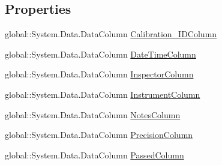 \subsection*{Properties}
\begin{DoxyCompactItemize}
\item 
global\+::\+System.\+Data.\+Data\+Column \hyperlink{class_env_int_1_1_win32_1_1_field_tech_1_1_manager_1_1_data_sets_1_1_guide_ware_mobile_data_set_1_1_calibration_data_table_af00e760d0cf55dffcf6ef86e61710cc1}{Calibration\+\_\+\+I\+D\+Column}
\item 
global\+::\+System.\+Data.\+Data\+Column \hyperlink{class_env_int_1_1_win32_1_1_field_tech_1_1_manager_1_1_data_sets_1_1_guide_ware_mobile_data_set_1_1_calibration_data_table_a5f2d3636ac3b1f398e2ce88fba54bf42}{Date\+Time\+Column}
\item 
global\+::\+System.\+Data.\+Data\+Column \hyperlink{class_env_int_1_1_win32_1_1_field_tech_1_1_manager_1_1_data_sets_1_1_guide_ware_mobile_data_set_1_1_calibration_data_table_a57337d5f30a8d20bf7a49d6facb5e600}{Inspector\+Column}
\item 
global\+::\+System.\+Data.\+Data\+Column \hyperlink{class_env_int_1_1_win32_1_1_field_tech_1_1_manager_1_1_data_sets_1_1_guide_ware_mobile_data_set_1_1_calibration_data_table_a777c3080082ce599c334d5c05e23b3b7}{Instrument\+Column}
\item 
global\+::\+System.\+Data.\+Data\+Column \hyperlink{class_env_int_1_1_win32_1_1_field_tech_1_1_manager_1_1_data_sets_1_1_guide_ware_mobile_data_set_1_1_calibration_data_table_afcfe2e1ebefd668c222e97eee0974f73}{Notes\+Column}
\item 
global\+::\+System.\+Data.\+Data\+Column \hyperlink{class_env_int_1_1_win32_1_1_field_tech_1_1_manager_1_1_data_sets_1_1_guide_ware_mobile_data_set_1_1_calibration_data_table_a4e2aa7afc257938676de8f1bcbd5350f}{Precision\+Column}
\item 
global\+::\+System.\+Data.\+Data\+Column \hyperlink{class_env_int_1_1_win32_1_1_field_tech_1_1_manager_1_1_data_sets_1_1_guide_ware_mobile_data_set_1_1_calibration_data_table_a85483a44069536bb3ee0b4480f52221a}{Passed\+Column}

\end{DoxyCompactItemize}
